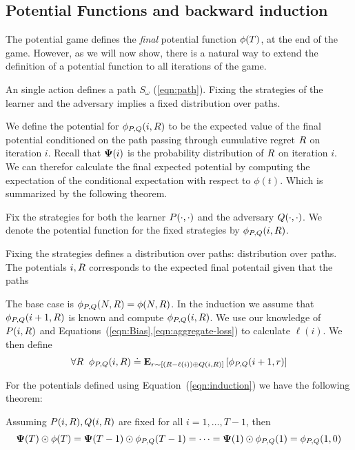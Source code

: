 \documentclass{article}[12pt]
\begin{document}
\subsection{Potential Functions and backward induction \label{sec:potentials}}

 The potential game defines the {\em final} potential
 function $\phi(T)$, at the end of the game. However, as we will now
 show, there is a natural way to extend the definition of a potential
 function to all iterations of the game.

 An single action defines a path $S_\omega$ (\ref{eqn:path}). Fixing
 the strategies of the learner and the adversary implies a fixed
 distribution over paths.

We define the potential for $\phi_{P,Q}(i,R)$ to be the expected value of
the final potential conditioned on the path passing through cumulative
regret $R$ on iteration $i$. Recall that ${\bf \Psi}(i)$ is the
probability distribution of $R$ on iteration $i$. We can therefor
calculate the final expected potential by computing the expectation of
the conditional expectation with respect to $\phi(t)$. Which is
summarized by the following theorem.

Fix the strategies for both the learner $P(\cdot,\cdot)$ and
the adversary $Q(\cdot,\cdot)$. We denote the potential
function for the fixed strategies by $\phi_{P,Q}(i,R)$.

Fixing the strategies defines a distribution over paths:
distribution over paths. The potentials $i,R$ corresponds to the
expected final potentail given that the paths 

The base case is  $\phi_{P,Q}(N,R) = \phi(N,R)$.
In the induction we assume that  $\phi_{P,Q}(i+1,R)$ is known and compute  $\phi_{P,Q}(i,R)$.
We use our knowledge of $P(i,R)$ and
Equations~(\ref{eqn:Bias},\ref{eqn:aggregate-loss}) to calculate
$\ell(i)$. We then define 
\begin{equation} \label{eqn:induction}
  \forall R\;\;
  \phi_{P,Q}(i,R) \doteq {\bf E}_{r \sim [(R-\ell(i)) \oplus Q(i,R)]}\left[ \phi_{P,Q}(i+1,r) \right]
\end{equation}

For the potentials defined using Equation~(\ref{eqn:induction}) we have the
following theorem:

\begin{theorem} \label{thm:backward-recursion}
Assuming $ P(i,R), Q(i,R)$ are fixed for all
$i=1,\ldots,T-1$, then
\[
   {\bf \Psi}(T)\odot \phi(T)=
   {\bf \Psi}(T-1)\odot \phi_{P,Q}(T-1)= \cdots =
   {\bf \Psi}(1)\odot \phi_{P,Q}(1)=\phi_{P,Q}(1,0)
  \]
\end{theorem}
\end{document}
